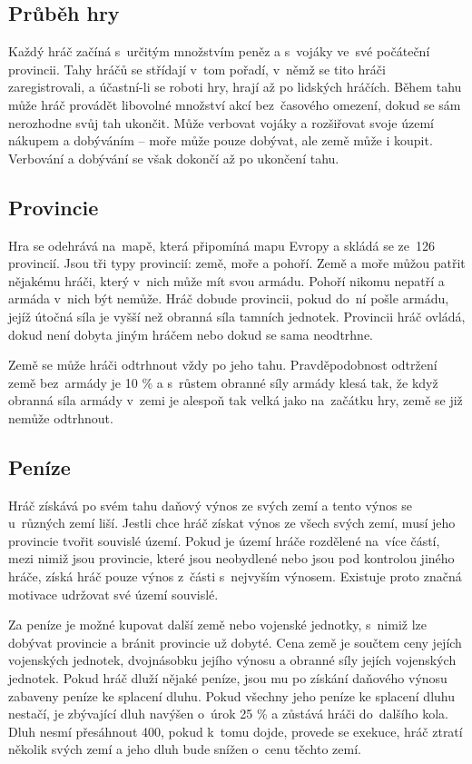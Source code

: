 \documentclass[a4paper,12pt]{article}
\begin{document}
\subsection{Průběh hry}
Každý hráč začíná s~určitým množstvím peněz a s~vojáky ve~své počáteční provincii. Tahy hráčů se střídají v~tom pořadí, v~němž se tito hráči zaregistrovali, a účastní-li se roboti hry, hrají až po lidských hráčích. Během tahu může hráč provádět libovolné množství akcí bez~časového omezení, dokud se sám nerozhodne svůj tah ukončit. Může verbovat vojáky a rozšiřovat svoje území nákupem a dobýváním -- moře může pouze dobývat, ale země může i koupit. Verbování a dobývání se však dokončí až po ukončení tahu.
\subsection{Provincie}
Hra se odehrává na~mapě, která připomíná mapu Evropy a skládá se ze~126 provincií. Jsou tři typy provincií: země, moře a pohoří. Země a moře můžou patřit nějakému hráči, který v~nich může mít svou armádu. Pohoří nikomu nepatří a armáda v~nich být nemůže. Hráč dobude provincii, pokud do~ní pošle armádu, jejíž útočná síla je vyšší než obranná síla tamních jednotek. Provincii hráč ovládá, dokud není dobyta jiným hráčem nebo dokud se sama neodtrhne.

Země se může hráči odtrhnout vždy po jeho tahu. Pravděpodobnost odtržení země bez~ar\-má\-dy je 10 \% a s~růstem obranné síly armády klesá tak, že když obranná síla ar\-má\-dy v~zemi je alespoň tak velká jako na~začátku hry, země se již nemůže odtrhnout.
\subsection{Peníze}
Hráč získává po svém tahu daňový výnos ze svých zemí a tento výnos se u~různých zemí liší. Jestli chce hráč získat výnos ze všech svých zemí, musí jeho provincie tvořit souvislé území. Pokud je území hráče rozdělené na~více částí, mezi nimiž jsou provincie, které jsou neobydlené nebo jsou pod kontrolou jiného hráče, získá hráč pouze výnos z~části s~nejvyším výnosem. Existuje proto značná motivace udržovat své území souvislé.

Za peníze je možné kupovat další země nebo vojenské jednotky, s~nimiž lze dobývat provincie a bránit provincie už dobyté. Cena země je součtem ceny jejích vojenských jednotek, dvojnásobku jejího výnosu a obranné síly jejích vojenských jednotek. Pokud hráč dluží nějaké peníze, jsou mu po získání daňového výnosu zabaveny peníze ke splacení dluhu. Pokud všechny jeho peníze ke splacení dluhu nestačí, je zbývající dluh navýšen o~úrok 25 \% a zůstává hráči do~dalšího kola. Dluh nesmí přesáhnout 400, pokud k~tomu dojde, provede se exekuce, hráč ztratí několik svých zemí a jeho dluh bude snížen o~cenu těchto zemí.
\end{document}

